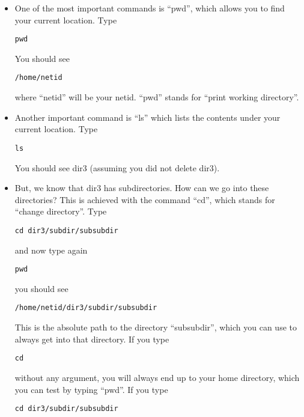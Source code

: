 \documentclass[aps,showpacs,prd,notitlepage,preprintnumbers,amsmath,amssymb,letterpaper]{revtex4}
\begin{document}
\begin{itemize}
\item One of the most
important commands is ``pwd'', which allows you to find your current
location. Type

\begin{verbatim}
pwd
\end{verbatim}

You should see

\begin{verbatim}
/home/netid
\end{verbatim}

where ``netid'' will be your netid. ``pwd'' stands for ``print working
directory''.

\item Another important command is ``ls'' which lists the contents under your
  current location.  Type
  
\begin{verbatim}
ls
\end{verbatim}

You should see dir3 (assuming you did not delete dir3).

\item But, we know that dir3 has subdirectories. How can we go into these directories? This is achieved with the command ``cd'', which stands for ``change directory''. Type

\begin{verbatim}
cd dir3/subdir/subsubdir
\end{verbatim}

and now type again

\begin{verbatim}
pwd
\end{verbatim}

you should see

\begin{verbatim}
/home/netid/dir3/subdir/subsubdir
\end{verbatim}

This is the absolute path to the directory ``subsubdir'', which you
can use to always get into that directory. If you type

\begin{verbatim}
cd
\end{verbatim}

without any argument, you will always end up to your home
directory, which you can test by typing ``pwd''. If you type

\begin{verbatim}
cd dir3/subdir/subsubdir
\end{verbatim}


\end{itemize}
\end{document}
